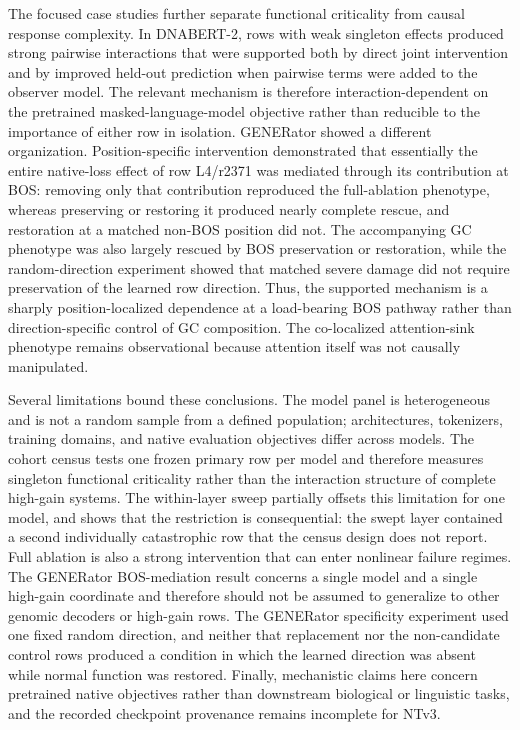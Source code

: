 \documentclass[11pt]{article}
\begin{document}
The focused case studies further separate functional criticality from causal response complexity. In DNABERT-2, rows with weak singleton effects produced strong pairwise interactions that were supported both by direct joint intervention and by improved held-out prediction when pairwise terms were added to the observer model. The relevant mechanism is therefore interaction-dependent on the pretrained masked-language-model objective rather than reducible to the importance of either row in isolation. GENERator showed a different organization. Position-specific intervention demonstrated that essentially the entire native-loss effect of row L4/r2371 was mediated through its contribution at BOS: removing only that contribution reproduced the full-ablation phenotype, whereas preserving or restoring it produced nearly complete rescue, and restoration at a matched non-BOS position did not. The accompanying GC phenotype was also largely rescued by BOS preservation or restoration, while the random-direction experiment showed that matched severe damage did not require preservation of the learned row direction. Thus, the supported mechanism is a sharply position-localized dependence at a load-bearing BOS pathway rather than direction-specific control of GC composition. The co-localized attention-sink phenotype remains observational because attention itself was not causally manipulated.

Several limitations bound these conclusions. The model panel is heterogeneous and is not a random sample from a defined population; architectures, tokenizers, training domains, and native evaluation objectives differ across models. The cohort census tests one frozen primary row per model and therefore measures singleton functional criticality rather than the interaction structure of complete high-gain systems. The within-layer sweep partially offsets this limitation for one model, and shows that the restriction is consequential: the swept layer contained a second individually catastrophic row that the census design does not report. Full ablation is also a strong intervention that can enter nonlinear failure regimes. The GENERator BOS-mediation result concerns a single model and a single high-gain coordinate and therefore should not be assumed to generalize to other genomic decoders or high-gain rows. The GENERator specificity experiment used one fixed random direction, and neither that replacement nor the non-candidate control rows produced a condition in which the learned direction was absent while normal function was restored. Finally, mechanistic claims here concern pretrained native objectives rather than downstream biological or linguistic tasks, and the recorded checkpoint provenance remains incomplete for NTv3.
\end{document}
